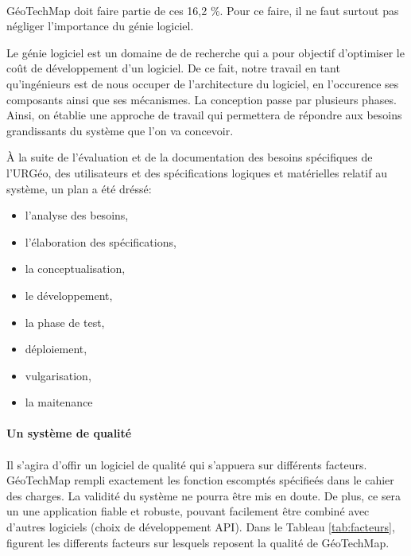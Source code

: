         \paragraph{}
        GéoTechMap doit faire partie de ces 16,2 \%. Pour ce faire, il ne faut surtout pas
        négliger l'importance du génie logiciel.
        \par
        Le génie logiciel est un domaine de de recherche qui a pour objectif
        d'optimiser le coût de développement d'un logiciel. De ce fait, notre
        travail en tant qu'ingénieurs est de nous occuper de l'architecture
        du logiciel, en l'occurence ses composants ainsi que ses mécanismes.
        La conception passe par plusieurs phases. Ainsi, on établie une approche
        de travail qui permettera de répondre aux besoins grandissants du système 
        que l'on va concevoir.
        \par
        À la suite de l'évaluation et de la documentation des besoins spécifiques
        de l'URGéo, des utilisateurs et des spécifications logiques et matérielles
        relatif au système, un plan a été dréssé:
        \begin{itemize}
                \item l'analyse des besoins,
                \item l'élaboration des spécifications,
                \item la conceptualisation,
                \item le développement,
                \item la phase de test,
                \item déploiement,
                \item vulgarisation,
                \item la maitenance
        \end{itemize}
        \paragraph{Un système de qualité}
        \paragraph{}
        Il s'agira d'offir un logiciel de qualité qui s'appuera sur différents facteurs.
        GéoTechMap rempli exactement les fonction escomptés spécifieés dans le 
        cahier des charges. La validité du système ne pourra être mis en doute.
        De plus, ce sera un une application fiable et robuste, pouvant facilement
        être combiné avec d'autres logiciels (choix de développement API). Dans le 
        Tableau \ref*{tab:facteurs}, figurent les differents facteurs sur lesquels reposent la qualité
        de GéoTechMap.

